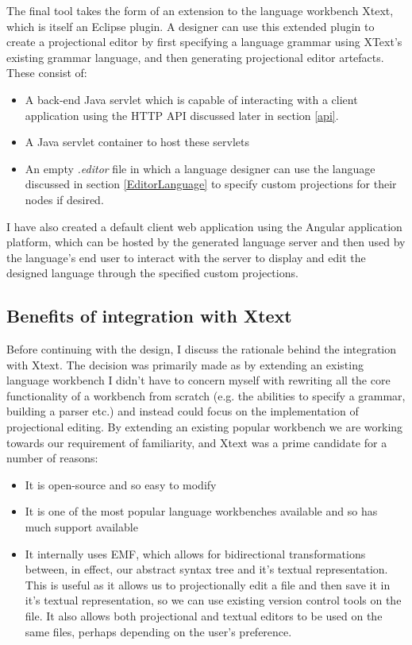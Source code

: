 \documentclass{article}
\begin{document}
The final tool takes the form of an extension to the language workbench Xtext, which is itself an Eclipse plugin. A designer can use this extended plugin to create a projectional editor by first specifying a language grammar using XText's existing grammar language, and then generating projectional editor artefacts. These consist of:
\begin{itemize}
\item A back-end Java servlet which is capable of interacting with a client application using the HTTP API discussed later in section \ref{api}.
\item A Java servlet container to host these servlets
\item An empty \emph{.editor} file in which a language designer can use the language discussed in section \ref{EditorLanguage} to specify custom projections for their nodes if desired.  
\end{itemize}
%
I have also created a default client web application using the Angular application platform\cite{angular}, which can be hosted by the generated language server and then used by the language's end user to interact with the server to display and edit the designed language through the specified custom projections. 

\subsection{Benefits of integration with Xtext}\label{integrationWithXtext}
Before continuing with the design, I discuss the rationale behind the integration with Xtext. The decision was primarily made as by extending an existing language workbench I didn't have to concern myself with rewriting all the core functionality of a workbench from scratch (e.g. the abilities to specify a grammar, building a parser etc.) and instead could focus on the implementation of projectional editing. By extending an existing popular workbench we are working towards our \RFamiliarity requirement of familiarity, and Xtext was a prime candidate for a number of reasons:
\begin{itemize}
\item{It is open-source and so easy to modify}
\item{It is one of the most popular language workbenches available and so has much support available}
\item{It internally uses EMF\cite{emf}, which allows for bidirectional transformations between, in effect, our abstract syntax tree and it's textual representation. This is useful as it allows us to projectionally edit a file and then save it in it's textual representation, so we can use existing version control tools on the file. It also allows both projectional and textual editors to be used on the same files, perhaps depending on the user's preference.}
\end{itemize}
\end{document}
